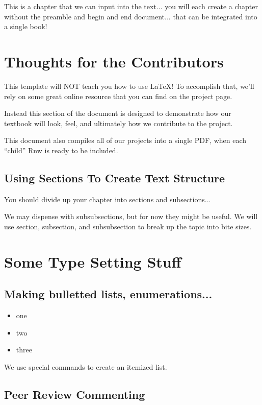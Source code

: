 This is a chapter that we can input into the text... you will each create a chapter without the preamble and begin and end document... that can be integrated into a single book! 

\section{Thoughts for the Contributors}

This template will NOT teach you how to use \LaTeX! To accomplish that, we'll rely on some great online resource that you can find on the project page. 

Instead this section of the document is designed to demonstrate how our textbook will look, feel, and ultimately how we contribute to the project.

This document also compiles all of our projects into a single PDF, when each ``child'' Rnw is ready to be included.

\subsection{Using Sections To Create Text Structure}

You should divide up your chapter into sections and subsections...


We may dispense with subsubsections, but for now they might be useful. We will use section, subsection, and subsubsection to break up the topic into bite sizes. 

\section{Some Type Setting Stuff}

\subsection{Making bulletted lists, enumerations...}

\begin{itemize}
\item one
\item two 
\item three
\end{itemize}

We use special commands to create an itemized list.

\subsection{Peer Review Commenting}

